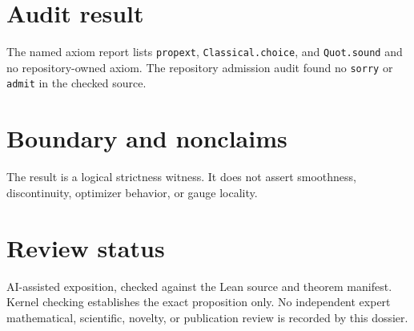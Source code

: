 \documentclass[11pt]{article}
\begin{document}
\section{Audit result}
The named axiom report lists \texttt{propext}, \texttt{Classical.choice}, and
\texttt{Quot.sound} and no repository-owned axiom.  The repository admission audit found no
\texttt{sorry} or \texttt{admit} in the checked source.

\section{Boundary and nonclaims}
The result is a logical strictness witness.  It does not assert smoothness, discontinuity, optimizer behavior, or gauge locality.

\section{Review status}
AI-assisted exposition, checked against the Lean source and theorem manifest.  Kernel checking
establishes the exact proposition only.  No independent expert mathematical, scientific,
novelty, or publication review is recorded by this dossier.
\end{document}
